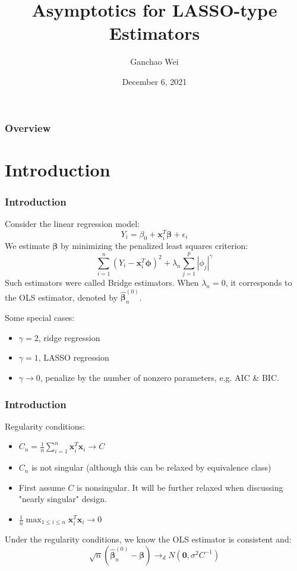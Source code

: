 \documentclass{beamer}
\title[Asymptotic LASSO]{Asymptotics for LASSO-type Estimators}
\author{Ganchao Wei}
\date{December 6, 2021}
\begin{document}
	
	\begin{frame}
		\titlepage %
	\end{frame}
	
	\begin{frame}
		\frametitle{Overview} %
		\tableofcontents
	\end{frame}
	
	
	\section{Introduction}
	
	\begin{frame}
		\frametitle{Introduction}
		Consider the linear regression model:
		$$Y_i = \beta_0 + \bm{x}_i^T\bm{\beta} + \epsilon_i$$
		We estimate $\bm{\beta}$ by minimizing the penalized least squares criterion:
		$$\sum_{i=1}^{n}(Y_i-\bm{x}_i^T\bm{\phi})^2 + \lambda_n\sum_{j=1}^{p}|\phi_j|^{\gamma}$$
		Such estimators were called Bridge estimators.
		When $\lambda_n = 0$, it corresponds to the OLS estimator, denoted by $\hat{\bm{\beta}}_n^{(0)}$.
		
		Some special cases:
		\begin{itemize}
			\item
			 $\gamma = 2$, ridge regression
			 \item
			 $\gamma = 1$, LASSO regression
			 \item
			 $\gamma \to 0$, penalize by the number of nonzero parameters, e.g. AIC \& BIC.
		\end{itemize}
	\end{frame}
	
	\begin{frame}
		\frametitle{Introduction}
		Regularity conditions:
		\begin{itemize}
			\item 
			$C_n = \frac{1}{n}\sum_{i=1}^{n}\bm{x}_i^T\bm{x}_i \to C$
			\item
			$C_n$ is not singular (although this can be relaxed by equivalence class)
			\item
			First assume $C$ is nonsingular. It will be further relaxed when discussing "nearly singular" design.
			\item
			$\frac{1}{n}\max_{1\leq i \leq n}\bm{x}_i^T\bm{x}_i \to 0$
		\end{itemize}
		 Under the regularity conditions, we know the OLS estimator is consistent and:
		$$\sqrt{n}(\hat{\bm{\beta}}_n^{(0)} - \bm{\beta}) \to_{d} N(\bm{0}, \sigma^2C^{-1})$$
	\end{frame}
	
\end{document}
